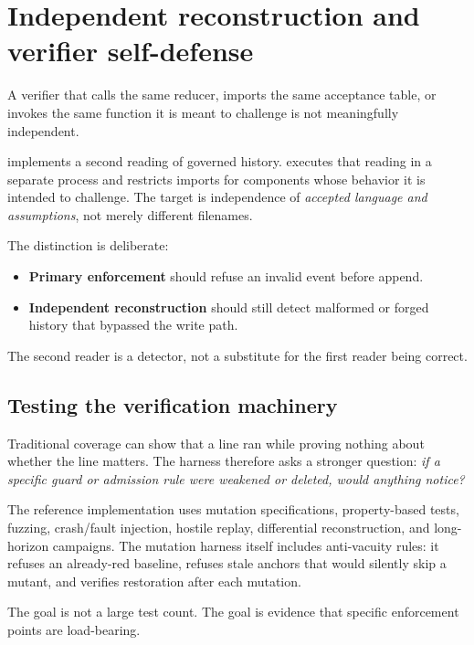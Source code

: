 \section{Independent reconstruction and verifier self-defense}

A verifier that calls the same reducer, imports the same acceptance table, or invokes the same function it is meant to challenge is not meaningfully independent.

 implements a second reading of governed history.  executes that reading in a separate process and restricts imports for components whose behavior it is intended to challenge. The target is independence of \emph{accepted language and assumptions}, not merely different filenames.

The distinction is deliberate:

\begin{itemize}
  \item \textbf{Primary enforcement} should refuse an invalid event before append.
  \item \textbf{Independent reconstruction} should still detect malformed or forged history that bypassed the write path.
\end{itemize}

The second reader is a detector, not a substitute for the first reader being correct.

\subsection{Testing the verification machinery}
Traditional coverage can show that a line ran while proving nothing about whether the line matters. The harness therefore asks a stronger question: \emph{if a specific guard or admission rule were weakened or deleted, would anything notice?}

The reference implementation uses mutation specifications, property-based tests, fuzzing, crash/fault injection, hostile replay, differential reconstruction, and long-horizon campaigns. The mutation harness itself includes anti-vacuity rules: it refuses an already-red baseline, refuses stale anchors that would silently skip a mutant, and verifies restoration after each mutation.

The goal is not a large test count. The goal is evidence that specific enforcement points are load-bearing.

